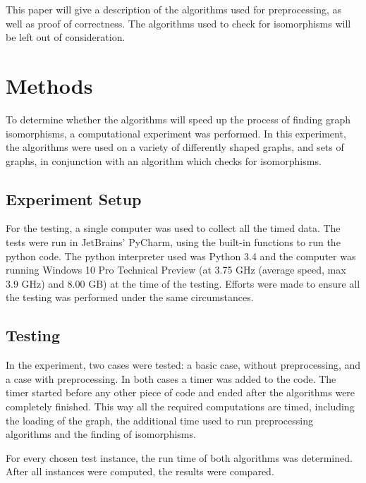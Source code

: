 \documentclass[twoside]{article}
\theoremstyle{definition}
\theoremstyle{plain}
\begin{document}
\begin{multicols}{2}
This paper will give a description of the algorithms used for preprocessing, as well as proof of correctness. The algorithms used to check for isomorphisms will be left out of consideration.

\section{Methods}
To determine whether the algorithms will speed up the process of finding graph isomorphisms, a computational experiment was performed. In this experiment, the algorithms were used on a variety of differently shaped graphs, and sets of graphs, in conjunction with an algorithm which checks for isomorphisms.

\subsection{Experiment Setup}
For the testing, a single computer was used to collect all the timed data. The tests were run in JetBrains' PyCharm, using the built-in functions to run the python code. The python interpreter used was Python 3.4 and the computer was running Windows 10 Pro Technical Preview (at 3.75 GHz (average speed, max 3.9 GHz) and 8.00 GB) at the time of the testing. Efforts were made to ensure all the testing was performed under the same circumstances.

\subsection{Testing}
In the experiment, two cases were tested: a basic case, without preprocessing, and a case with preprocessing. In both cases a timer was added to the code. The timer started before any other piece of code and ended after the algorithms were completely finished. This way all the required computations are timed, including the loading of the graph, the additional time used to run preprocessing algorithms and the finding of isomorphisms.

For every chosen test instance, the run time of both algorithms was determined. After all instances were computed, the results were compared.


\end{multicols}
\end{document}
